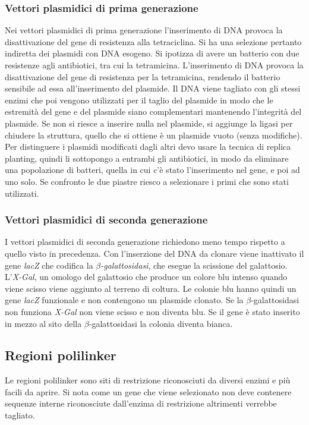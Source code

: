 		\subsubsection{Vettori plasmidici di prima generazione}
		Nei vettori plasmidici di prima generazione l'inserimento di DNA provoca la disattivazione del gene di resistenza alla tetraciclina. 
		Si ha una selezione pertanto indiretta dei plasmidi con DNA esogeno.
		Si ipotizza di avere un batterio con due resistenze agli antibiotici, tra cui la tetramicina. 
		L'inserimento di DNA provoca la disattivazione del gene di resistenza per la tetramicina, rendendo il batterio sensibile ad essa all'inserimento del plasmide.
		Il DNA viene tagliato con gli stessi enzimi che poi vengono utilizzati per il taglio del plasmide in modo che le estremità del gene e del plasmide siano complementari mantenendo l'integrità del plasmide. 
		Se non si riesce a inserire nulla nel plasmide, si aggiunge la ligasi per chiudere la struttura, quello che si ottiene è un plasmide vuoto (senza modifiche). 
		Per distinguere i plasmidi modificati dagli altri devo usare la tecnica di replica planting, quindi li sottopongo a entrambi gli antibiotici, in modo da eliminare una popolazione di batteri, quella in cui c'è stato l'inserimento nel gene, e poi ad uno solo.
		Se confronto le due piastre riesco a selezionare i primi che sono stati utilizzati. 

		\subsubsection{Vettori plasmidici di seconda generazione}
		I vettori plasmidici di seconda generazione richiedono meno tempo rispetto a quello visto in precedenza. 
		Con l'inserzione del DNA da clonare viene inattivato il gene \emph{lacZ} che codifica la \emph{$\beta$-galattosidasi}, che esegue la scissione del galattosio. 
		L'\emph{X-Gal}, un omologo del galattosio che produce un colore blu intenso quando viene scisso viene aggiunto al terreno di coltura. 
		Le colonie blu hanno quindi un gene \emph{lacZ} funzionale e non contengono un plasmide clonato.
		Se la $\beta$-galattosidasi non funziona \emph{X-Gal} non viene scisso e non diventa blu.
		Se il gene è stato inserito in mezzo al sito della $\beta$-galattosidasi la colonia diventa bianca. 

	\subsection{Regioni polilinker}
	Le regioni polilinker sono siti di restrizione riconosciuti da diversi enzimi e pi\`u facili da aprire.
	Si nota come un gene che viene selezionato non deve contenere sequenze interne riconosciute dall'enzima di restrizione altrimenti verrebbe tagliato.

